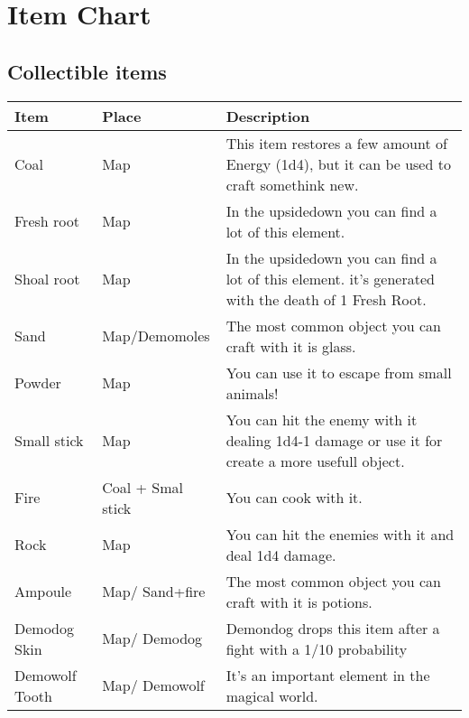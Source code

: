 \section{Item Chart}


\subsection{Collectible items}
\vspace*{0.5cm}

\begin{center}
	\begin{tabular}[c]{| p{2cm} | p{} | p{5cm} |}
		\hline
		Item &  Place & Description \\
		\hline
		Coal & Map & This item restores a few amount of Energy (1d4), but it can be used to craft somethink new.\\
		\hline
		Fresh root &  Map & In the upsidedown you can find a lot of this element.\\
		\hline
		Shoal root &  Map & In the upsidedown you can find a lot of this element. it's generated with the death of 1 Fresh Root.\\
		\hline
		Sand &   Map/Demomoles & The most common object you can craft with it is glass.\\
		\hline
		Powder &  Map & You can use it to escape from small animals!\\
		\hline
		Small stick & Map & You can hit the enemy with it dealing 1d4-1 damage or use it for create a more usefull object.\\
		\hline
		Fire & Coal + Smal stick & You can cook with it.\\
		\hline
		Rock & Map & You can hit the enemies with it and deal 1d4 damage.\\
		\hline
		Ampoule & Map/ Sand+fire & The most common object you can craft with it is potions.\\
		\hline
		Demodog Skin & Map/ Demodog & Demondog drops this item after a fight with a 1/10 probability\\
		\hline
		Demowolf Tooth &  Map/ Demowolf & It's an important element in the magical world.\\
		\hline
		

\end{tabular}
\end{center}
